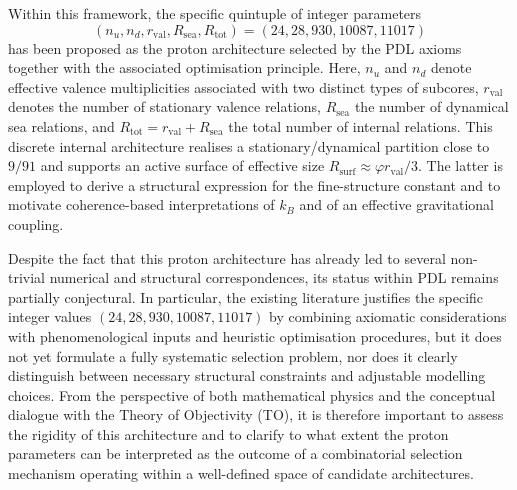 \documentclass[11pt,a4paper]{article}
\theoremstyle{definition}
\begin{document}
Within this framework, the specific quintuple of integer parameters
\[
 (n_u,n_d,r_{\mathrm{val}},R_{\mathrm{sea}},R_{\mathrm{tot}}) = (24,28,930,10087,11017)
\]
has been proposed as the proton architecture selected by the PDL axioms together with the associated optimisation principle.\cite{Combinatorial_Proton_v2_2026,PDL_Global_Mapping_2026} Here, $n_u$ and $n_d$ denote effective valence multiplicities associated with two distinct types of subcores, $r_{\mathrm{val}}$ denotes the number of stationary valence relations, $R_{\mathrm{sea}}$ the number of dynamical sea relations, and $R_{\mathrm{tot}}=r_{\mathrm{val}}+R_{\mathrm{sea}}$ the total number of internal relations.\cite{Combinatorial_Proton_v2_2026} This discrete internal architecture realises a stationary/dynamical partition close to $9/91$ and supports an active surface of effective size $R_{\mathrm{surf}}\approx \varphi r_{\mathrm{val}}/3$. The latter is employed to derive a structural expression for the fine-structure constant and to motivate coherence-based interpretations of $k_B$ and of an effective gravitational coupling.\cite{Alpha_PDL_v2_2026,Golden_Ratio_Sketch_2026,Effective_Fields_PDL_2026,Exponent_18_PDL_2026}

Despite the fact that this proton architecture has already led to several non-trivial numerical and structural correspondences, its status within PDL remains partially conjectural.\cite{Combinatorial_Proton_v2_2026,PDL_Global_Mapping_2026} In particular, the existing literature justifies the specific integer values $(24,28,930,10087,11017)$ by combining axiomatic considerations with phenomenological inputs and heuristic optimisation procedures, but it does not yet formulate a fully systematic selection problem, nor does it clearly distinguish between necessary structural constraints and adjustable modelling choices.\cite{PDL_Global_Mapping_2026,PDL_TO_Dialogue_2026} From the perspective of both mathematical physics and the conceptual dialogue with the Theory of Objectivity (TO), it is therefore important to assess the rigidity of this architecture and to clarify to what extent the proton parameters can be interpreted as the outcome of a combinatorial selection mechanism operating within a well-defined space of candidate architectures.\cite{PDL_TO_Dialogue_2026}
\end{document}
